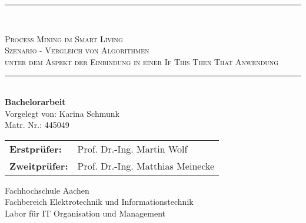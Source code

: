 \begin{titlepage}
\begin{center}
\hfill
\newcommand{\HorizontalLine}{\rule{\linewidth}{0.3mm}}
\HorizontalLine \\[0.4cm]
\begin{spacing}{2.5}
    \textsc{\Large  Process Mining im Smart Living} \\
    \textsc{\Large  Szenario - Vergleich von Algorithmen} \\
    \textsc{\Large   unter dem Aspekt der Einbindung in einer If This Then That Anwendung}\\
\end{spacing}
\HorizontalLine \\[0.5cm]

\vspace{20mm}
{\Large \bfseries Bachelorarbeit}\\[1.1cm]
{\large Vorgelegt von: Karina Schmunk} \\[0.5cm]
{\large Matr. Nr.: 445049} \\[2.2cm]

\begin{tabular}[hc]{>{\large}l >{\large}l}
  \bfseries Erstprüfer: & Prof. Dr.-Ing. Martin Wolf \\[0.3cm]
  \bfseries Zweitprüfer: & Prof. Dr.-Ing. Matthias Meinecke \\[1.2cm]
\end{tabular}
\vfill  %

\Large {
    Fachhochschule Aachen\\
    Fachbereich Elektrotechnik und Informationstechnik\\
    Labor für IT Organisation und Management\\[1cm]

    
}
\end{center}
\end{titlepage}
